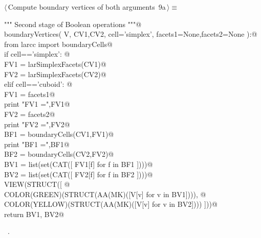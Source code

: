 \documentclass[11pt,oneside]{article}	%
\begin{document}
\begin{flushleft} \small \label{scrap12}
\protect{}$\langle\,$Compute boundary vertices of both arguments\nobreak\ {\footnotesize 9a}$\,\rangle\equiv$
\vspace{-1ex}
\begin{list}{}{} \item
\mbox{}\verb@""" Second stage of Boolean operations """@\\
\mbox{}\verb@def boundaryVertices( V, CV1,CV2, cell='simplex', facets1=None,facets2=None ):@\\
\mbox{}\verb@   from larcc import boundaryCells@\\
\mbox{}\verb@   if cell=='simplex': @\\
\mbox{}\verb@      FV1 = larSimplexFacets(CV1)@\\
\mbox{}\verb@      FV2 = larSimplexFacets(CV2)@\\
\mbox{}\verb@   elif cell=='cuboid': @\\
\mbox{}\verb@      FV1 = facets1@\\
\mbox{}\verb@      print "\n FV1 =",FV1@\\
\mbox{}\verb@      FV2 = facets2@\\
\mbox{}\verb@      print "\n FV2 =",FV2@\\
\mbox{}\verb@   BF1 = boundaryCells(CV1,FV1)@\\
\mbox{}\verb@   print "\n BF1 =",BF1@\\
\mbox{}\verb@   BF2 = boundaryCells(CV2,FV2)@\\
\mbox{}\verb@   BV1 = list(set(CAT([ FV1[f] for f in BF1 ])))@\\
\mbox{}\verb@   BV2 = list(set(CAT([ FV2[f] for f in BF2 ])))@\\
\mbox{}\verb@   VIEW(STRUCT([ @\\
\mbox{}\verb@      COLOR(GREEN)(STRUCT(AA(MK)([V[v] for v in BV1]))), @\\
\mbox{}\verb@      COLOR(YELLOW)(STRUCT(AA(MK)([V[v] for v in BV2]))) ]))@\\
\mbox{}\verb@   return BV1, BV2@\\
\mbox{}\verb@@{\NWsep}
\end{list}
\vspace{-1ex}
\footnotesize\addtolength{\baselineskip}{-1ex}
\begin{list}{}{\setlength{\itemsep}{-\parsep}\setlength{\itemindent}{-\leftmargin}}
\item \NWtxtMacroRefIn\ .
\end{list}
\end{flushleft}
\end{document}
